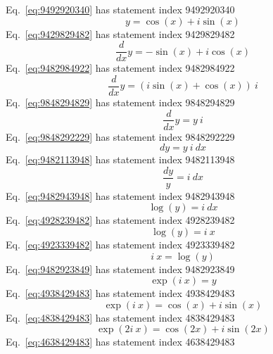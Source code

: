 \documentclass[12pt]{report}
\begin{document}
Eq.~\ref{eq:9492920340} has statement index 9492920340
\begin{equation}
y = \cos(x)+i \sin(x)
\label{eq:9492920340}
\end{equation}
Eq.~\ref{eq:9429829482} has statement index 9429829482
\begin{equation}
\frac{d}{dx} y= -\sin(x) + i\cos(x)
\label{eq:9429829482}
\end{equation}
Eq.~\ref{eq:9482984922} has statement index 9482984922
\begin{equation}
\frac{d}{dx} y= (i\sin(x) + \cos(x))\ i
\label{eq:9482984922}
\end{equation}
Eq.~\ref{eq:9848294829} has statement index 9848294829
\begin{equation}
\frac{d}{dx} y= y\ i
\label{eq:9848294829}
\end{equation}
Eq.~\ref{eq:9848292229} has statement index 9848292229
\begin{equation}
dy = y\ i\ dx
\label{eq:9848292229}
\end{equation}
Eq.~\ref{eq:9482113948} has statement index 9482113948
\begin{equation}
\frac{dy}{y} = i\ dx
\label{eq:9482113948}
\end{equation}
Eq.~\ref{eq:9482943948} has statement index 9482943948
\begin{equation}
\log(y) = i\ dx
\label{eq:9482943948}
\end{equation}
Eq.~\ref{eq:4928239482} has statement index 4928239482
\begin{equation}
\log(y) = i\ x
\label{eq:4928239482}
\end{equation}
Eq.~\ref{eq:4923339482} has statement index 4923339482
\begin{equation}
i\ x = \log(y)
\label{eq:4923339482}
\end{equation}
Eq.~\ref{eq:9482923849} has statement index 9482923849
\begin{equation}
\exp(i\ x) = y
\label{eq:9482923849}
\end{equation}
Eq.~\ref{eq:4938429483} has statement index 4938429483
\begin{equation}
\exp(i\ x) = \cos(x)+i \sin(x)
\label{eq:4938429483}
\end{equation}
Eq.~\ref{eq:4838429483} has statement index 4838429483
\begin{equation}
\exp(2i\ x) = \cos(2x)+i \sin(2x)
\label{eq:4838429483}
\end{equation}
Eq.~\ref{eq:4638429483} has statement index 4638429483
\end{document}
